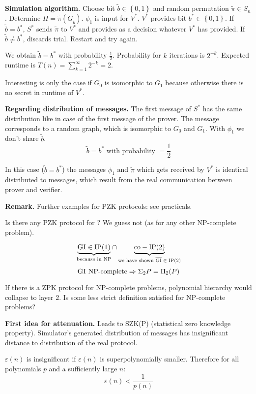 \documentclass[a4paper]{article}
\newcommand{\cls}[1]{\rm{#1}}
\newcommand{\probl}[1]{\text{\textsc{#1}}}
\newcommand{\set}[1]{\left\{#1\right\}}
\begin{document}
\textbf{Simulation algorithm.}
Choose bit $\tilde{b} \in \set{0,1}$ and random permutation $\tilde{\pi} \in S_n$.
Determine $H = \tilde{\pi}(G_{\tilde{b}})$. $\phi_1$ is input for $V^*$. $V^*$
provides bit $b^* \in \set{0,1}$. If $\tilde{b} = b^*$, $S^*$ sends $\tilde{\pi}$
to $V^*$ and provides as a decision whatever $V^*$ has provided.
If $\tilde{b} \neq b^*$, discards trial. Restart and try again.

We obtain $\tilde{b} = b^*$ with probability $\frac12$.
Probability for $k$ iterations is $2^{-k}$. Expected runtime is
$T(n) = \sum_{k=1}^\infty 2^{-k} = 2$.

Interesting is only the case if $G_0$ is isomorphic to $G_1$
because otherwise there is no secret in runtime of $V^*$.

\textbf{Regarding distribution of messages.}
The first message of $S^*$ has the same distribution like in case of the
first message of the prover. The message corresponds to a random graph,
which is isomorphic to $G_0$ and $G_1$. With $\phi_1$ we don't share $\tilde{b}$.
\[
  \tilde{b} = b^* \text{ with probability } = \frac12
\]

In this case ($\tilde{b} = b^*$) the messages $\phi_1$ and $\tilde{\pi}$ which
gets received by $V^*$ is identical distributed to messages, which result from
the real communication between prover and verifier.

\textbf{Remark.} Further examples for PZK protocols: see practicals.

Is there any PZK protocol for \probl{Hamiltonian Path}? We guess not (as for any other
\cls{NP}-complete problem).

\[
  \underbrace{\probl{GI} \in \cls{IP(1)}}_{\text{because in \cls{NP}}} \cap
  \underbrace{\cls{co-IP(2)}}_{\text{we have shown $\overline{\probl{GI}} \in \probl{IP(2)}$}}
\] \[
  \probl{GI} \text{ \cls{NP}-complete} \Rightarrow \Sigma_2 P = \Pi_2(P)
\]

If there is a ZPK protocol for \cls{NP}-complete problems, polynomial hierarchy would
collapse to layer 2. Is some less strict definition satisfied for \cls{NP}-complete
problems?

\textbf{First idea for attenuation.}
  Leads to \cls{SZK(P)} (statistical zero knowledge property).
  Simulator's generated distribution of messages has insignificant distance to
  distribution of the real protocol.

$\varepsilon(n)$ is insignificant if $\varepsilon(n)$ is superpolynomially
smaller. Therefore for all polynomials $p$ and a sufficiently large $n$:
\[
  \varepsilon(n) < \frac{1}{p(n)}
\]
\end{document}
